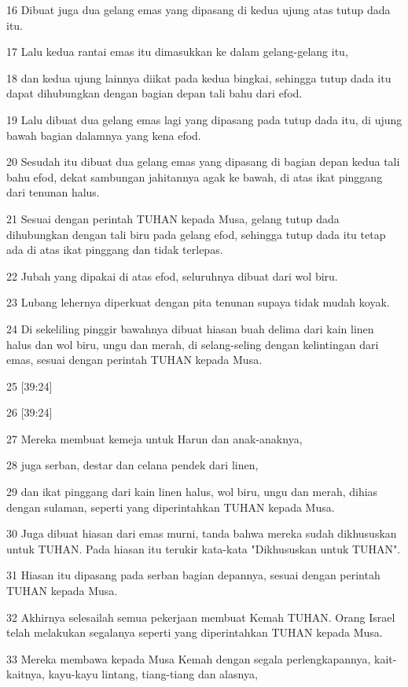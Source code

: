 \par 16 Dibuat juga dua gelang emas yang dipasang di kedua ujung atas tutup dada itu.
\par 17 Lalu kedua rantai emas itu dimasukkan ke dalam gelang-gelang itu,
\par 18 dan kedua ujung lainnya diikat pada kedua bingkai, sehingga tutup dada itu dapat dihubungkan dengan bagian depan tali bahu dari efod.
\par 19 Lalu dibuat dua gelang emas lagi yang dipasang pada tutup dada itu, di ujung bawah bagian dalamnya yang kena efod.
\par 20 Sesudah itu dibuat dua gelang emas yang dipasang di bagian depan kedua tali bahu efod, dekat sambungan jahitannya agak ke bawah, di atas ikat pinggang dari tenunan halus.
\par 21 Sesuai dengan perintah TUHAN kepada Musa, gelang tutup dada dihubungkan dengan tali biru pada gelang efod, sehingga tutup dada itu tetap ada di atas ikat pinggang dan tidak terlepas.
\par 22 Jubah yang dipakai di atas efod, seluruhnya dibuat dari wol biru.
\par 23 Lubang lehernya diperkuat dengan pita tenunan supaya tidak mudah koyak.
\par 24 Di sekeliling pinggir bawahnya dibuat hiasan buah delima dari kain linen halus dan wol biru, ungu dan merah, di selang-seling dengan kelintingan dari emas, sesuai dengan perintah TUHAN kepada Musa.
\par 25 [39:24]
\par 26 [39:24]
\par 27 Mereka membuat kemeja untuk Harun dan anak-anaknya,
\par 28 juga serban, destar dan celana pendek dari linen,
\par 29 dan ikat pinggang dari kain linen halus, wol biru, ungu dan merah, dihias dengan sulaman, seperti yang diperintahkan TUHAN kepada Musa.
\par 30 Juga dibuat hiasan dari emas murni, tanda bahwa mereka sudah dikhususkan untuk TUHAN. Pada hiasan itu terukir kata-kata "Dikhususkan untuk TUHAN".
\par 31 Hiasan itu dipasang pada serban bagian depannya, sesuai dengan perintah TUHAN kepada Musa.
\par 32 Akhirnya selesailah semua pekerjaan membuat Kemah TUHAN. Orang Israel telah melakukan segalanya seperti yang diperintahkan TUHAN kepada Musa.
\par 33 Mereka membawa kepada Musa Kemah dengan segala perlengkapannya, kait-kaitnya, kayu-kayu lintang, tiang-tiang dan alasnya,
